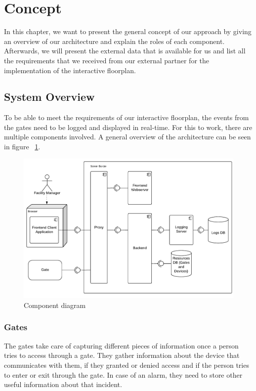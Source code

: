 \section{Concept}

In this chapter, we want to present the general concept of our approach by giving an overview of our architecture and explain the roles of each component. Afterwards, we will present the external data that is available for us and list all the requirements that we received from our external partner for the implementation of the interactive floorplan.

\subsection{System Overview}

To be able to meet the requirements of our interactive floorplan, the events from the gates need to be logged and displayed in real-time. For this to work, there are multiple components involved. A general overview of the architecture can be seen in figure ~\ref{fig:Komponentendiagramm}.

\begin{figure}[!hb]
    \centering
    \includegraphics[width=1\linewidth]{images/Komponentendiagramm}
    \caption{Component diagram}
    \label{fig:Komponentendiagramm}
\end{figure}

\subsubsection{Gates}
\label{Gates}

The gates take care of capturing different pieces of information once a person tries to access through a gate. They gather information about the device that communicates with them, if they granted or denied access and if the person tries to enter or exit through the gate. In case of an alarm, they need to store other useful information about that incident.

